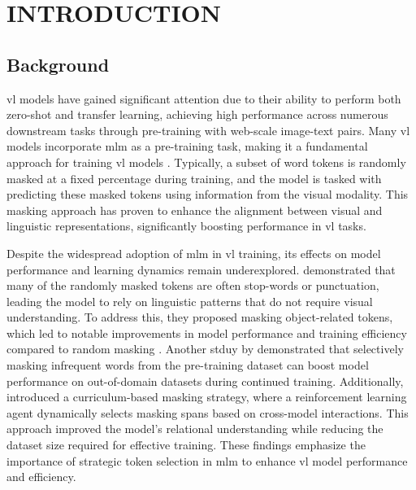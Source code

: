 \setlength{\parindent}{0in}
\setlength{\parskip}{1.5mm}
\setlength{\baselineskip}{1.6em}

\chapter{INTRODUCTION}
\section{Background}
\acrfull{vl} models have gained significant attention due to their ability to perform both zero-shot and transfer learning, achieving high performance across numerous downstream tasks through pre-training with web-scale image-text pairs.
Many \acrshort{vl} models incorporate \acrfull{mlm} as a pre-training task, making it a fundamental approach for training \acrshort{vl} models \cite{albef, mplug, uniter, beit-3}.
Typically, a subset of word tokens is randomly masked at a fixed percentage during training, and the model is tasked with predicting these masked tokens using information from the visual modality.
This masking approach has proven to enhance the alignment between visual and linguistic representations, significantly boosting performance in \acrshort{vl} tasks.

Despite the widespread adoption of \acrshort{mlm} in \acrshort{vl} training, its effects on model performance and learning dynamics remain underexplored.
 demonstrated that many of the randomly masked tokens are often stop-words or punctuation, leading the model to rely on linguistic patterns that do not require visual understanding.
To address this, they proposed masking object-related tokens, which led to notable improvements in model performance and training efficiency compared to random masking \cite{mask_object}.
Another stduy by  demonstrated that selectively masking infrequent words from the pre-training dataset can boost model performance on out-of-domain datasets during continued training.
Additionally,  introduced a curriculum-based masking strategy, where a reinforcement learning agent dynamically selects masking spans based on cross-model interactions. This approach improved the model's relational understanding while reducing the dataset size required for effective training.
These findings emphasize the importance of strategic token selection in \acrshort{mlm} to enhance \acrshort{vl} model performance and efficiency.

